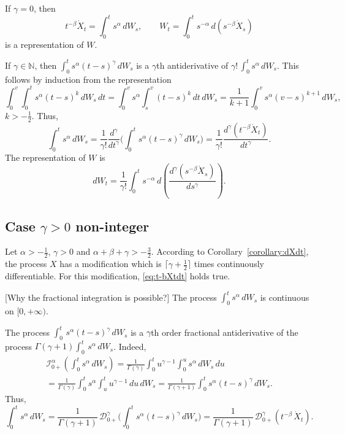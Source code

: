 \documentclass{article}
\newcommand{\dotX}{\dot{X}}
\theoremstyle{plain}
\theoremstyle{remark}
\theoremstyle{definition}
\begin{document}
If $\gamma=0$, then
\[
	t^{-\beta} \dotX_t = \int_0^t s^\alpha \, dW_s, \qquad
	W_t = \int_0^t s^{-\alpha} \, d(s^{-\beta} \dotX_s)
\]
is a representation of $W$.

If $\gamma\in\mathbb{N}$, then
$\int_0^t s^\alpha (t-s)^\gamma \, dW_s$
is a $\gamma$th antiderivative
of $\gamma! \, \int_0^t s^\alpha \, dW_s$.
This follows by induction from the representation
\[
	\int_0^v \int_0^t \! s^\alpha (t{-}s)^k \, dW_s \, dt
	=
	\int_0^v \! s^\alpha \! \int_s^v (t{-}s)^k \, dt \, dW_s
	=
	\frac{1}{k{+}1} \int_0^v \! s^\alpha (v{-}s)^{k+1} \, dW_s,
\]
$k\mathbin{>}{-}\frac12$. Thus,
\[
	\int_0^t s^\alpha \, dW_s = \frac{1}{\gamma!}
	\frac{d^\gamma}{dt^\gamma}
	\biggl(
	\int_0^t s^\alpha (t-s)^\gamma \, dW_s
	\biggr)
	= \frac{1}{\gamma!} \frac{d^\gamma (t^{-\beta} \dotX_t)}
	{dt^\gamma} .
\]
The representation of $W$ is
\[
	dW_t = \frac{1}{\gamma!}
	\int_0^t s^{-\alpha} \,
	d\!\left(
	\frac{d^\gamma (s^{-\beta} \dotX_s)}
	{ds^\gamma}
	\right).
\]

\subsection[Case $\gamma> 0$ non-integer]
{Case \boldmath$\gamma> 0$ non-integer}
\label{ss:invrepgammapositive}
Let $\alpha\mathbin{>}{-}\frac12$, $\gamma\mathbin{>}0$
and $\alpha+\beta+\gamma\mathbin{>}{-}\frac32$.
According to Corollary~\ref{corollary:dXdt},
the process $X$ has a modification
which is $\lceil \gamma{+}\frac12\rceil$ times
continuously differentiable.
For this modification, \eqref{eq:t-bXtdt}
holds true.

[Why the fractional integration is possible?]
The process $\int_0^t s^\alpha \, dW_s$ is
continuous on $[0,+\infty)$.

The process $\int_0^t \, s^\alpha (t-s)^\gamma \, dW_s$
is a $\gamma$th order fractional antiderivative
of the process
$\Gamma(\gamma{+}1) \int_0^t \, s^\alpha \, dW_s$.
Indeed,
\begin{multline*}
	\mathcal{I}^\alpha_{0+}\!\left(
	\int_0^t s^\alpha \, dW_s\right)
	=
	\frac{1}{\Gamma(\gamma)}
	\int_0^t u^{\gamma-1} \int_0^u s^\alpha \, dW_s \, du
	\\=
	\frac{1}{\Gamma(\gamma)}
	\int_0^t s^\alpha \int_u^t u^{\gamma-1} \, du \, dW_s
	=
	\frac{1}{\Gamma(\gamma{+}1)}
	\int_0^t s^\alpha (t-s)^\gamma \, dW_s .
\end{multline*}
Thus,
\[
	\int_0^t s^\alpha \, dW_s
	= \frac{1}{\Gamma(\gamma{+}1)}
	\, \mathcal{D}^{\gamma}_{0+} \!
	\biggl( \int_0^t s^\alpha (t-s)^\gamma \, dW_s \biggr)
	= \frac{1}{\Gamma(\gamma{+}1)}
	\, \mathcal{D}^{\gamma}_{0+} (t^{-\beta} \, \dotX_t) .
\]
\end{document}
